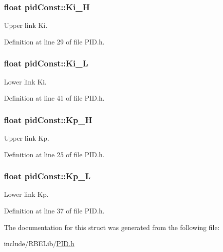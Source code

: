 \hypertarget{structpid_const_a2d06f9407c1fd682baa8519e5744384a}{
\subsubsection[{Ki\-\_\-\-H}]{\setlength{\rightskip}{0pt plus 5cm}float pid\-Const\-::\-Ki\-\_\-\-H}}\label{structpid_const_a2d06f9407c1fd682baa8519e5744384a}


Upper link Ki. 



Definition at line 29 of file P\-I\-D.\-h.

\hypertarget{structpid_const_a073fd5fd7eccdab0c8c7d5ad15bcb4c0}{
\subsubsection[{Ki\-\_\-\-L}]{\setlength{\rightskip}{0pt plus 5cm}float pid\-Const\-::\-Ki\-\_\-\-L}}\label{structpid_const_a073fd5fd7eccdab0c8c7d5ad15bcb4c0}


Lower link Ki. 



Definition at line 41 of file P\-I\-D.\-h.

\hypertarget{structpid_const_ae2c7d62f4fd919c89233a39e1a84b2db}{
\subsubsection[{Kp\-\_\-\-H}]{\setlength{\rightskip}{0pt plus 5cm}float pid\-Const\-::\-Kp\-\_\-\-H}}\label{structpid_const_ae2c7d62f4fd919c89233a39e1a84b2db}


Upper link Kp. 



Definition at line 25 of file P\-I\-D.\-h.

\hypertarget{structpid_const_a0e30018aca6e06a3c00d16b39f3f0133}{
\subsubsection[{Kp\-\_\-\-L}]{\setlength{\rightskip}{0pt plus 5cm}float pid\-Const\-::\-Kp\-\_\-\-L}}\label{structpid_const_a0e30018aca6e06a3c00d16b39f3f0133}


Lower link Kp. 



Definition at line 37 of file P\-I\-D.\-h.



The documentation for this struct was generated from the following file\-:\begin{DoxyCompactItemize}
\item 
include/\-R\-B\-E\-Lib/\hyperlink{_p_i_d_8h}{P\-I\-D.\-h}\end{DoxyCompactItemize}
